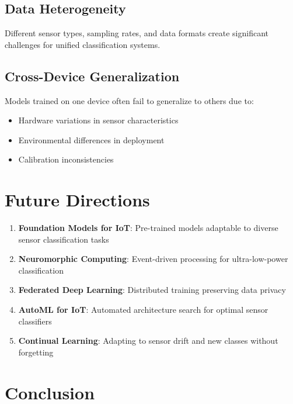 \documentclass[12pt,a4paper]{article}
\begin{document}
\subsection{Data Heterogeneity}

Different sensor types, sampling rates, and data formats create significant challenges for unified classification systems.

\subsection{Cross-Device Generalization}

Models trained on one device often fail to generalize to others due to:
\begin{itemize}
    \item Hardware variations in sensor characteristics
    \item Environmental differences in deployment
    \item Calibration inconsistencies
\end{itemize}

\section{Future Directions}

\begin{enumerate}
    \item \textbf{Foundation Models for IoT}: Pre-trained models adaptable to diverse sensor classification tasks
    \item \textbf{Neuromorphic Computing}: Event-driven processing for ultra-low-power classification
    \item \textbf{Federated Deep Learning}: Distributed training preserving data privacy
    \item \textbf{AutoML for IoT}: Automated architecture search for optimal sensor classifiers
    \item \textbf{Continual Learning}: Adapting to sensor drift and new classes without forgetting
\end{enumerate}

\section{Conclusion}
\end{document}
